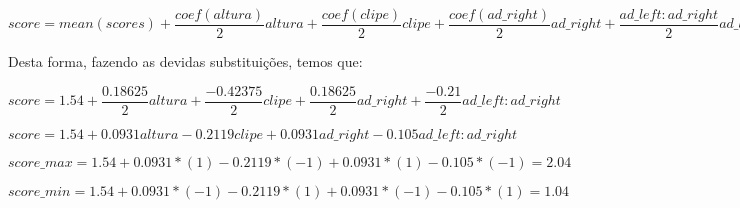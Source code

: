 \begin{center}
$
  score = mean(scores) + \dfrac{coef(altura)}{2}altura + \dfrac{coef(clipe)}{2}clipe + \dfrac{coef(ad\_right)}{2}ad\_right +  \dfrac{ad\_left:ad\_right}{2}ad\_left:ad\_right
$  
\end{center}

Desta forma, fazendo as devidas substituições, temos que:

\begin{center}
  $
    score = 1.54 + \dfrac{0.18625}{2}altura + \dfrac{-0.42375}{2}clipe + \dfrac{0.18625}{2}ad\_right +  \dfrac{-0.21}{2}ad\_left:ad\_right
  $  

  $ score = 1.54 + 0.0931altura- 0.2119clipe + 0.0931ad\_right - 0.105ad\_left:ad\_right$

  $score\_max =  1.54 + 0.0931*(1)- 0.2119*(-1) + 0.0931*(1) - 0.105*(-1) = 2.04$

  $score\_min =  1.54 + 0.0931*(-1)- 0.2119*(1) + 0.0931*(-1) - 0.105*(1) = 1.04$
  \end{center}

% 
